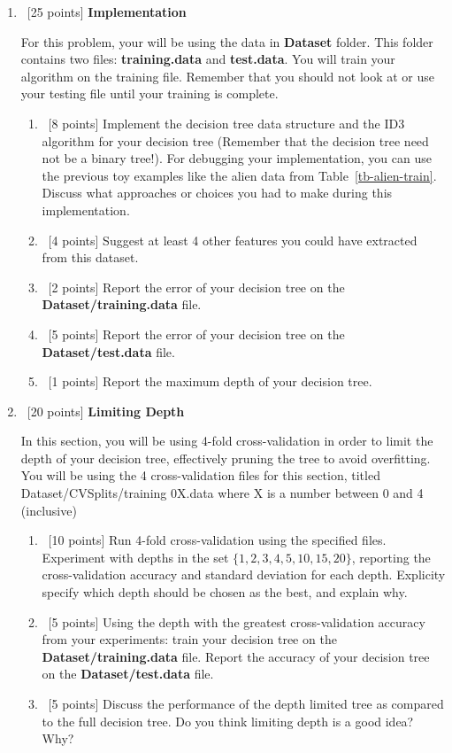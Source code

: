 \begin{enumerate}
    \item~[25 points] \textbf{Implementation}

        For this problem, your will be using the data in \textbf{Dataset} folder.
        This folder contains two files: \textbf{training.data} and \textbf{test.data}.
        You will train your algorithm on the training file.
        Remember that you should not look at or use your testing file until your training is complete.
    \begin{enumerate}
        \item~[8 points] Implement the decision tree data structure and the ID3 algorithm for your decision tree (Remember that the decision tree need not be a binary tree!).
        For debugging your implementation, you can use the previous toy examples like the alien data from Table~\ref{tb-alien-train}.
        Discuss what approaches or choices you had to make during this implementation.
        \item~[4 points] Suggest at least 4 other features you could have extracted from this dataset.
        \item~[2 points] Report the error of your decision tree on the \textbf{Dataset/training.data} file.
        \item~[5 points] Report the error of your decision tree on the \textbf{Dataset/test.data} file.
        \item~[1 points] Report the maximum depth of your decision tree.
    \end{enumerate}
    \item~[20 points] \textbf{Limiting Depth}

        In this section, you will be using 4-fold cross-validation in order to limit the depth of your decision tree, effectively pruning the tree to avoid overfitting.
        You will be using the 4 cross-validation files for this section, titled Dataset/CVSplits/training 0X.data where X is a number between 0 and 4 (inclusive)
        \begin{enumerate}
            \item~[10 points] Run 4-fold cross-validation using the specified files.
            Experiment with depths in the set $\{1,2,3,4,5,10,15,20\}$, reporting the cross-validation accuracy and standard deviation for each depth. Explicity specify which depth should be chosen as the best, and explain why.
            \item~[5 points] Using the depth with the greatest cross-validation accuracy from your experiments: train your decision tree on the \textbf{Dataset/training.data} file. Report the accuracy of your decision tree on the \textbf{Dataset/test.data} file.
            \item~[5 points] Discuss the performance of the depth limited tree as compared to the full decision tree. Do you think limiting depth is a good idea? Why?
        \end{enumerate}

\end{enumerate}

